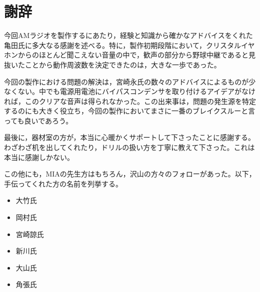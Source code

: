 \documentclass[report.tex]{subfiles}
\begin{document}
\section{謝辞}
今回AMラジオを製作するにあたり，経験と知識から確かなアドバイスをくれた亀田氏に多大なる感謝を述べる。特に，製作初期段階において，クリスタルイヤホンからのほとんど聞こえない音量の中で，歓声の部分から野球中継であると見抜いたことから動作周波数を決定できたのは，大きな一歩であった。

今回の製作における問題の解決は，宮崎永氏の数々のアドバイスによるものが少なくない。中でも電源用電池にバイパスコンデンサを取り付けるアイデアがなければ，このクリアな音声は得られなかった。この出来事は，問題の発生源を特定するのにも大きく役立ち，今回の製作においてまさに一番のブレイクスルーと言っても良いであろう。

最後に，器材室の方が，本当に心暖かくサポートして下さったことに感謝する。わざわざ机を出してくれたり，ドリルの扱い方を丁寧に教えて下さった。これは本当に感謝しかない。

この他にも，MIAの先生方はもちろん，沢山の方々のフォローがあった。以下，手伝ってくれた方の名前を列挙する。
\begin{itemize}
  \item 大竹氏
  \item 岡村氏
  \item 宮崎諒氏
  \item 新川氏
  \item 大山氏
  \item 角張氏
\end{itemize}
\end{document}
